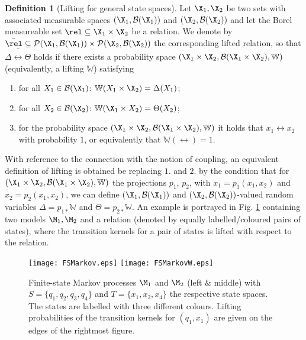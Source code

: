 \documentclass[letterpaper, 10 pt, conference]{amsart}
\theoremstyle{definition}
\newtheorem{defn}[definition]{Definition}
\theoremstyle{example}
\theoremstyle{remark}
\begin{document}
\begin{defn}[Lifting for general state spaces] \label{def:lifting}
Let $\X_1,\X_2$ be two sets with associated measurable spaces $(\X_1,\mathcal B(\X_1))$ and $(\X_2,\mathcal B(\X_2))$ and let the Borel measureable set $\rel\subseteq \X_1\times \X_2$ be a relation. 
We denote by 
$\bar\rel\subseteq \mathcal{P}(\X_1,\mathcal B(\X_1))\times \mathcal{P}(\X_2,\mathcal B(\X_2))$ the corresponding lifted relation, 
so that $\Delta \bar \rel \Theta$ holds if there exists a probability space $(\X_1\times \X_2,\mathcal B(\X_1\times \X_2)
, \mathbb W)$ 
(equivalently, a lifting $\mathbb W$) satisfying 
{ \setlength{\parskip}{-1pt}\setlength{\parsep}{0pt} \begin{enumerate}
\item for all $X_1\in \mathcal{B}(\X_1)$: $\mathbb W(X_1\times \X_2)=\Delta(X_1)$;
\item  for all $X_2\in \mathcal{B}(\X_2)$:  $\mathbb W(\X_1\times X_2)=\Theta(X_2)$;
\item for the probability space  $(\X_1\times \X_2,\mathcal B(\X_1\times \X_2), \mathbb W)$ it holds that 
$x_1\rel x_2$ with probability $1$, or equivalently that $\mathbb{W}\left(\rel\right)=1$.
\end{enumerate}}\noindent
\end{defn} 
\smallskip 
With reference to the connection with the notion of coupling, 
an equivalent definition of lifting is obtained be replacing $1.$ and $2.$ by the condition that for $(\X_1\times \X_2,\mathcal B(\X_1\times \X_2), \mathbb W)$  the projections $p_1$, $p_2$, with $x_1=p_1(x_1,x_2)$ and $x_2=p_2(x_1,x_2)$, we can define $(\X_1,\mathcal B(\X_1))$ and $(\X_2,\mathcal B(\X_2))$-valued random variables $\Delta=p_{1\ast} \mathbb W$ and $\Theta=p_{2\ast} \mathbb W $. 
An example is portrayed in Fig. \ref{fig:lifting1} containing two models $\M_1, \M_2$ and a relation (denoted by equally labelled/coloured pairs of states), where the transition kernels for a pair of states is lifted with respect to the relation. 
  \begin{figure}[htp] 
     \centering
     \texttt{[image: FSMarkov.eps]} 
     \texttt{[image: FSMarkovW.eps]} 
     \caption{ Finite-state Markov processes $\M_1$ and $\M_2$ (left $\&$ middle) with  $S=\{q_1,q_2,q_3,q_4\}$ and $T=\{x_1,x_2,x_4\}$ the respective state spaces.  
   The states are labelled with three different colours.
   Lifting probabilities of the transition kernels for $(q_1,x_1)$ are given on the edges of the rightmost figure.}\label{fig:lifting1}\end{figure}
\end{document}
